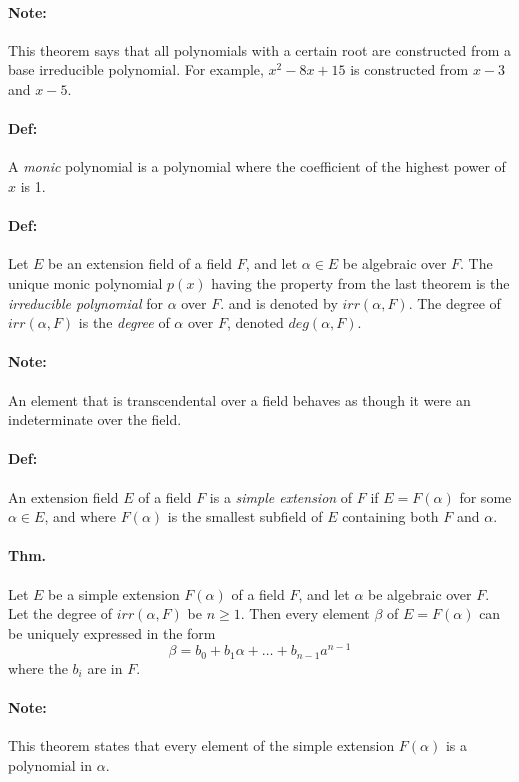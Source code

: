 \documentclass[10pt,a4paper]{article}
\begin{document}
\paragraph{Note:} This theorem says that all polynomials with a certain root are constructed from a base irreducible polynomial. For example, $x^2 -8x + 15$ is constructed from $x-3$ and $x-5$.

\paragraph{Def:} A \textit{monic} polynomial is a polynomial where the coefficient of the highest power of $x$ is 1.

\paragraph{Def:} Let $E$ be an extension field of a field $F$, and let $\alpha \in E$ be algebraic over $F$. The unique monic polynomial $p(x)$ having the property from the last theorem is the \textit{irreducible polynomial} for $\alpha$ over $F$. and is denoted by $irr(\alpha, F)$. The degree of $irr(\alpha, F)$ is the \textit{degree} of $\alpha$ over $F$, denoted $deg(\alpha, F)$.

\paragraph{Note:} An element that is transcendental over a field behaves as though it were an indeterminate over the field. 

\paragraph{Def:} An extension field $E$ of a field $F$ is a \textit{simple extension} of $F$ if $E = F(\alpha)$ for some $\alpha \in E$, and where $F(\alpha)$ is the smallest subfield of $E$ containing both $F$ and $\alpha$.

\paragraph{Thm.} Let $E$ be a simple extension $F(\alpha)$ of a field $F$, and let $\alpha$ be algebraic over $F$. Let the degree of $irr(\alpha, F)$ be $n \geq 1$. Then every element $\beta$ of $E = F(\alpha)$ can be uniquely expressed in the form
$$ \beta = b_0 +b_1\alpha + \dots + b_{n-1}a^{n-1}$$
where the $b_i$ are in $F$.

\paragraph{Note:} This theorem states that every element of the simple extension $F(\alpha)$ is a polynomial in $\alpha$.
\end{document}
